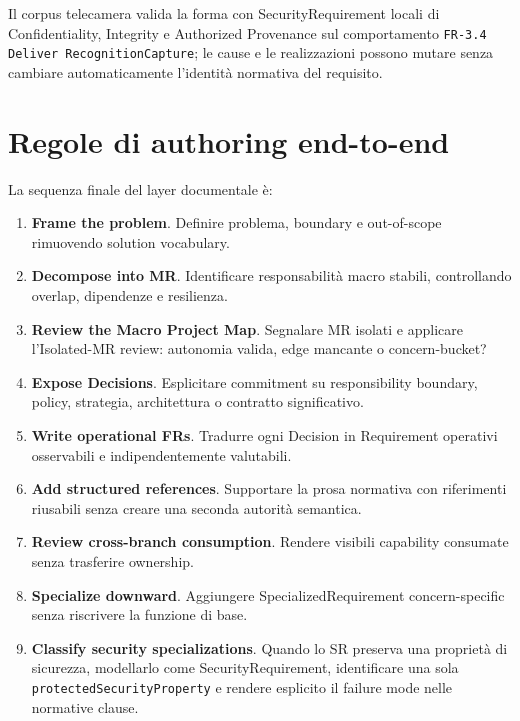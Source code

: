 \documentclass[12pt,a4paper,oneside]{report}
\begin{document}
Il corpus telecamera valida la forma con SecurityRequirement locali di Confidentiality, Integrity e Authorized Provenance sul comportamento \texttt{FR-3.4 Deliver RecognitionCapture}; le cause e le realizzazioni possono mutare senza cambiare automaticamente l'identità normativa del requisito.

\section{Regole di authoring end-to-end}

La sequenza finale del layer documentale è:
\begin{enumerate}
  \item \textbf{Frame the problem}. Definire problema, boundary e out-of-scope rimuovendo solution vocabulary.
  \item \textbf{Decompose into MR}. Identificare responsabilità macro stabili, controllando overlap, dipendenze e resilienza.
  \item \textbf{Review the Macro Project Map}. Segnalare MR isolati e applicare l'Isolated-MR review: autonomia valida, edge mancante o concern-bucket?
  \item \textbf{Expose Decisions}. Esplicitare commitment su responsibility boundary, policy, strategia, architettura o contratto significativo.
  \item \textbf{Write operational FRs}. Tradurre ogni Decision in Requirement operativi osservabili e indipendentemente valutabili.
  \item \textbf{Add structured references}. Supportare la prosa normativa con riferimenti riusabili senza creare una seconda autorità semantica.
  \item \textbf{Review cross-branch consumption}. Rendere visibili capability consumate senza trasferire ownership.
  \item \textbf{Specialize downward}. Aggiungere SpecializedRequirement concern-specific senza riscrivere la funzione di base.
  \item \textbf{Classify security specializations}. Quando lo SR preserva una proprietà di sicurezza, modellarlo come SecurityRequirement, identificare una sola \texttt{protectedSecurityProperty} e rendere esplicito il failure mode nelle normative clause.
\end{enumerate}
\end{document}
